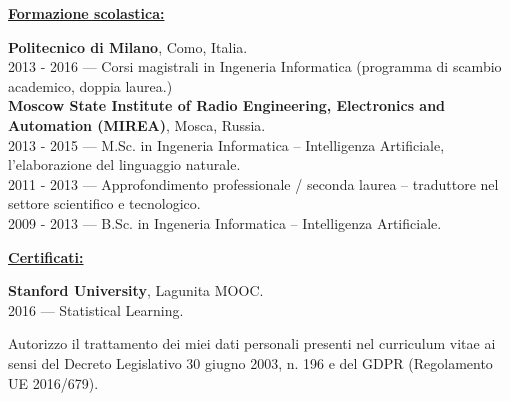 \documentclass[a4paper,10pt,fullpage]{article}
\begin{document}
\begin{center}
	\underline{\textbf{\large Formazione scolastica:}}
\end{center}	
\textbf{Politecnico di Milano}, Como, Italia.\\
2013 - 2016 --- Corsi magistrali in Ingeneria Informatica (programma di scambio academico, doppia laurea.)\\

\textbf{Moscow State Institute of Radio Engineering, Electronics and Automation (MIREA)}, Mosca,
Russia.\\
2013 - 2015 --- M.Sc. in Ingeneria Informatica -- Intelligenza Artificiale, l'elaborazione del linguaggio naturale.\\
2011 - 2013 --- Approfondimento professionale / seconda laurea -- traduttore nel settore scientifico e tecnologico. \\
2009 - 2013 --- B.Sc. in Ingeneria Informatica -- Intelligenza Artificiale.


\begin{center}
\underline{\textbf{\large Certificati:}}
\end{center}	
\textbf{Stanford University}, Lagunita MOOC.\\
2016 --- Statistical Learning.


\vfill

\hline
\vspace{3pt}
\scriptsize Autorizzo il trattamento dei miei dati personali presenti nel curriculum vitae ai sensi del Decreto Legislativo 30 giugno 2003, n. 196 e del GDPR (Regolamento UE 2016/679).

\end{document}
